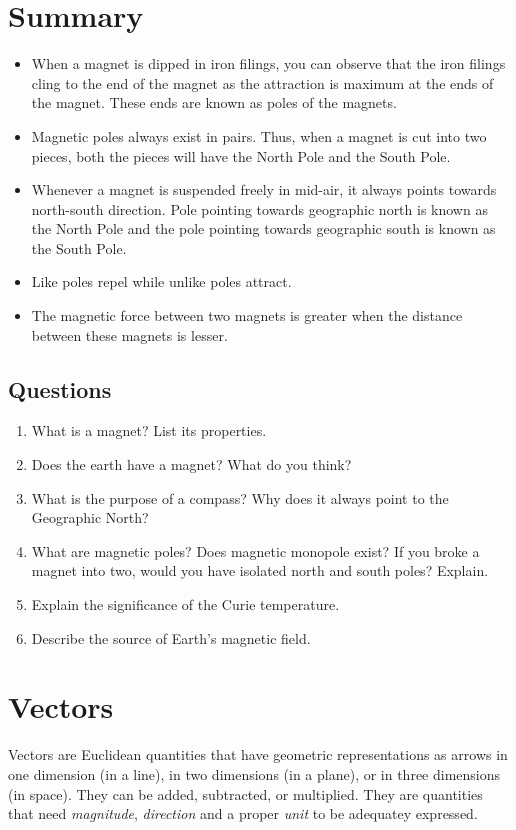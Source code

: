 \documentclass[9pt]{exam}
\begin{document}
	\section*{Summary}
	\begin{itemize}
		\item When a magnet is dipped in iron filings, you can observe that the iron filings cling to the end of the magnet as the attraction is maximum at the ends of the magnet. These ends are known as poles of the magnets.
		\item Magnetic poles always exist in pairs. Thus, when a magnet is cut into two pieces, both the pieces will have the North Pole and the South Pole.
		\item Whenever a magnet is suspended freely in mid-air, it always points towards north-south direction. Pole pointing towards geographic north is known as the North Pole and the pole pointing towards geographic south is known as the South Pole.
		\item Like poles repel while unlike poles attract.
		\item The magnetic force between two magnets is greater when the distance between these magnets is lesser.
	\end{itemize}
	\subsection*{Questions}
	\begin{enumerate}
		\item What is a magnet? List its properties.
		\item Does the earth have a magnet? What do you think?
		\item What is the purpose of a compass? Why does it always point to the Geographic North?
		\item What are magnetic poles? Does magnetic monopole exist? If you broke a magnet into two, would you have isolated north
		and south poles? Explain.
		\item Explain the significance of the Curie temperature.
		\item Describe the source of Earth's magnetic field.
	\end{enumerate}

\section*{Vectors}
Vectors are Euclidean quantities that have geometric representations as arrows in one dimension (in a line), in two dimensions (in a plane), or in three dimensions (in space). They can be added, subtracted, or multiplied. They are quantities that need \textit{magnitude}, \textit{direction} and a proper \textit{unit} to be adequatey expressed.
\end{document}
